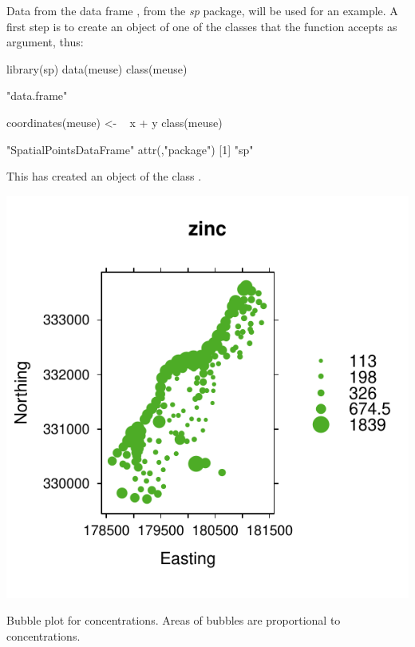 Data from the data frame , from the \textit{sp} package, will be used for an
example.  A first step is to create an object of one of the classes
that the function  accepts as argument, thus:
\begin{Schunk}
\begin{Sinput}
library(sp)
data(meuse)
class(meuse)
\end{Sinput}
\begin{Soutput}
[1] "data.frame"
\end{Soutput}
\begin{Sinput}
coordinates(meuse) <- ~ x + y
class(meuse)
\end{Sinput}
\begin{Soutput}
[1] "SpatialPointsDataFrame"
attr(,"package")
[1] "sp"
\end{Soutput}
\end{Schunk}
\noindent
This has created an object of the class .
\begin{marginfigure}[-15pt]
\vspace*{-9pt}
\begin{Schunk}


\centerline{\includegraphics[width=\textwidth]{figs/04-bubble-1} }

\end{Schunk}
\caption{Bubble plot for  concentrations.  Areas of
  bubbles are proportional to concentrations.\label{fig:Znbubble}}
\end{marginfigure}
